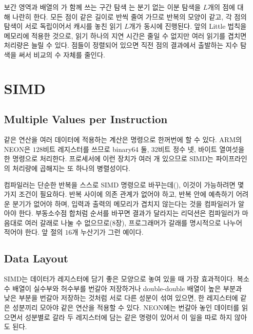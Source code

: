 \begin{instardust}
보간 영역과 배열의 가 함께 쓰는 구간 탐색 는 분기 없는 이분 탐색을 $L$개의 점에 대해 나란히 한다. 모든 점이 같은 길이로 반씩 줄여 가므로 반복의 모양이 같고, 각 점의 탐색이 서로 독립이어서 캐시를 놓친 읽기 $L$개가 동시에 진행된다. 앞의 Little 법칙을 메모리에 적용한 것으로, 읽기 하나의 지연 시간은 줄일 수 없지만 여러 읽기를 겹치면 처리량은 늘릴 수 있다. 점들이 정렬되어 있으면 직전 점의 결과에서 출발하는 지수 탐색을 써서 비교의 수 자체를 줄인다.
\end{instardust}

\section{SIMD}
\label{sec:simd}

\subsection{Multiple Values per Instruction}

같은 연산을 여러 데이터에 적용하는 계산은  명령으로 한꺼번에 할 수 있다. ARM의 NEON은 $128$비트 레지스터를 쓰므로 binary64 둘, $32$비트 정수 넷, 바이트 열여섯을 한 명령으로 처리한다. 프로세서에 이런 장치가 여러 개 있으므로 SIMD는 파이프라인의 처리량에 곱해지는 또 하나의 병렬성이다.

컴파일러는 단순한 반복을 스스로 SIMD 명령으로 바꾸는데(), 이것이 가능하려면 몇 가지 조건이 필요하다. 반복 사이에 의존 관계가 없어야 하고, 반복 안에 예측하기 어려운 분기가 없어야 하며, 입력과 출력의 메모리가 겹치지 않는다는 것을 컴파일러가 알아야 한다. 부동소수점 합처럼 순서를 바꾸면 결과가 달라지는 리덕션은 컴파일러가 마음대로 여러 갈래로 나눌 수 없으므로(8장), 프로그래머가 갈래를 명시적으로 나누어 적어야 한다. 앞 절의 $16$개 누산기가 그런 예이다.

\subsection{Data Layout}

SIMD는 데이터가 레지스터에 담기 좋은 모양으로 놓여 있을 때 가장 효과적이다. 복소수 배열이 실수부와 허수부를 번갈아 저장하거나 double-double 배열이 높은 부분과 낮은 부분을 번갈아 저장하는 것처럼 서로 다른 성분이 섞여 있으면, 한 레지스터에 같은 성분끼리 모아야 같은 연산을 적용할 수 있다. NEON에는 번갈아 놓인 데이터를 읽으면서 성분별로 갈라 두 레지스터에 담는  같은 명령이 있어서 이 일을 따로 하지 않아도 된다.

